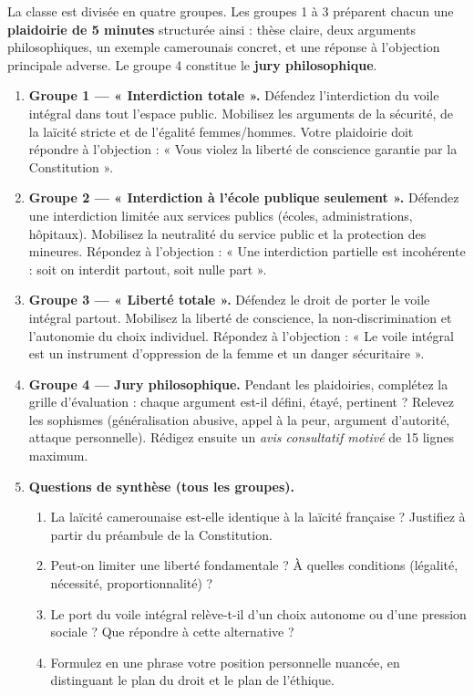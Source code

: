 \documentclass[11pt]{article}
\newcommand{\cle}[1]{{\popxbold\color{popdark}#1}}
\newcounter{popsec}
\newcounter{popsub}
\newcommand{\courssub}[1]{%
  \stepcounter{popsub}%
  \par\vspace{9pt}\noindent{\popxbold\fontsize{11.5}{13}\selectfont\color{popink}{\color{poporange}\thepopsec.\thepopsub}\hspace{6pt}#1}\par\nopagebreak\vspace{4pt}
}
\begin{document}
\courssub{Consignes}

La classe est divisée en quatre groupes. Les groupes 1 à 3 préparent chacun une \textbf{plaidoirie de 5 minutes} structurée ainsi : thèse claire, deux arguments philosophiques, un exemple camerounais concret, et une réponse à l'objection principale adverse. Le groupe 4 constitue le \textbf{jury philosophique}.

\begin{enumerate}
\item \textbf{Groupe 1 — « Interdiction totale ».} Défendez l'interdiction du voile intégral dans tout l'espace public. Mobilisez les arguments de la sécurité, de la laïcité stricte et de l'égalité femmes/hommes. Votre plaidoirie doit répondre à l'objection : « Vous violez la liberté de conscience garantie par la Constitution ».
\item \textbf{Groupe 2 — « Interdiction à l'école publique seulement ».} Défendez une interdiction limitée aux services publics (écoles, administrations, hôpitaux). Mobilisez la neutralité du service public et la protection des mineures. Répondez à l'objection : « Une interdiction partielle est incohérente : soit on interdit partout, soit nulle part ».
\item \textbf{Groupe 3 — « Liberté totale ».} Défendez le droit de porter le voile intégral partout. Mobilisez la liberté de conscience, la non-discrimination et l'autonomie du choix individuel. Répondez à l'objection : « Le voile intégral est un instrument d'oppression de la femme et un danger sécuritaire ».
\item \textbf{Groupe 4 — Jury philosophique.} Pendant les plaidoiries, complétez la grille d'évaluation : chaque argument est-il défini, étayé, pertinent ? Relevez les sophismes (généralisation abusive, appel à la peur, argument d'autorité, attaque personnelle). Rédigez ensuite un \emph{avis consultatif motivé} de 15 lignes maximum.
\item \textbf{Questions de synthèse (tous les groupes).} 
\begin{enumerate}
\item La laïcité camerounaise est-elle identique à la laïcité française ? Justifiez à partir du préambule de la Constitution.
\item Peut-on limiter une liberté fondamentale ? À quelles conditions (légalité, nécessité, proportionnalité) ?
\item Le port du voile intégral relève-t-il d'un choix autonome ou d'une pression sociale ? Que répondre à cette alternative ?
\item Formulez en une phrase votre position personnelle nuancée, en distinguant le plan du \cle{droit} et le plan de l'\cle{éthique}.
\end{enumerate}
\end{enumerate}
\end{document}
